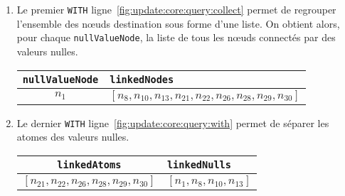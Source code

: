 \begin{example}
\begin{enumerate}[label=\emph{Etape~\arabic*},leftmargin=*]
		\item Le premier \verb|WITH| ligne~\ref{fig:update:core:query:collect} permet de regrouper l'ensemble des nœuds destination sous forme d'une liste.
		      On obtient alors, pour chaque \verb|nullValueNode|, la liste de tous les nœuds connectés par des valeurs nulles.
		      \begin{center}
			      \begin{tabular}{cl}
				      \hline
				      \verb|nullValueNode| & \verb|linkedNodes|                                                        \\
				      \hline
				      $n_{1}$              & $[n_{8}, n_{10}, n_{13}, n_{21}, n_{22}, n_{26}, n_{28}, n_{29}, n_{30}]$ \\
				      \hline
			      \end{tabular}
		      \end{center}

		\item Le dernier \verb|WITH| ligne~\ref{fig:update:core:query:with} permet de séparer les atomes des valeurs nulles.
		      \begin{center}
			      \begin{tabular}{cl}
				      \hline
				      \verb|linkedAtoms|                                 & \verb|linkedNulls|               \\
				      \hline
				      $[n_{21}, n_{22}, n_{26}, n_{28}, n_{29}, n_{30}]$ & $[n_{1}, n_{8}, n_{10}, n_{13}]$ \\
				      \hline
			      \end{tabular}
		      \end{center}


\end{enumerate}
\end{example}
